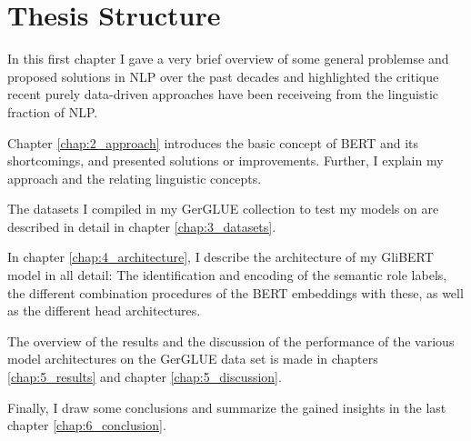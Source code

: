 \section{Thesis Structure}

In this first chapter I gave a very brief overview of some general problemse and proposed solutions in
NLP over the past decades and highlighted the critique recent purely data-driven approaches have been
receiveing from the linguistic fraction of NLP.

Chapter \ref{chap:2_approach} introduces the basic concept of BERT and its shortcomings,
and presented solutions or improvements. Further, I explain my approach and the relating
linguistic concepts.

The datasets I compiled in my GerGLUE collection to test my models on are described in detail in
chapter \ref{chap:3_datasets}.

In chapter \ref{chap:4_architecture}, I describe the architecture of my GliBERT model in all
detail: The identification and encoding of the semantic role labels, the different combination
procedures of the BERT embeddings with these, as well as the different head architectures.

The overview of the results and the discussion of the performance of the various model architectures on
the GerGLUE data set is made in chapters \ref{chap:5_results} and chapter \ref{chap:5_discussion}.

Finally, I draw some conclusions and summarize the gained insights in the last chapter \ref{chap:6_conclusion}.

